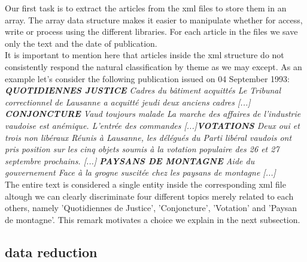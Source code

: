 \documentclass[11pt]{article}
\begin{document}
Our first task is to extract the articles from the xml files to store them in an array. The array data structure makes it easier to manipulate whether for access, write or process using the different
libraries. For each article in the files we save only the text and the date of publication.\\
It is important to mention here that articles inside the xml structure do not consistently respond the natural classification by theme as we may except. As an example let's consider the following publication issued on 04 September 1993:\\

\textit{\textbf{QUOTIDIENNES JUSTICE} Cadres du bâtiment acquittés Le Tribunal correctionnel de Lausanne a acquitté jeudi deux anciens cadres [...] \textbf{CONJONCTURE} Vaud toujours malade La marche des affaires de l'industrie vaudoise est anémique. L'entrée des commandes [...]\textbf{VOTATIONS} Deux oui et trois non libéraux Réunis à Lausanne, les délégués du Parti libéral vaudois ont pris position sur les cinq objets soumis à la votation populaire des 26 et 27 septembre prochains. [...] \textbf{PAYSANS DE MONTAGNE} Aide du gouvernement Face à la grogne suscitée chez les paysans de montagne [...]}\\

The entire text is considered a single entity inside the corresponding xml file altough we can clearly discriminate four different topics merely related to each others, namely 'Quotidiennes de Justice', 'Conjoncture', 'Votation' and 'Paysan de montagne'. This remark motivates a choice we explain in the next subsection.

\subsection{data reduction}
\end{document}
